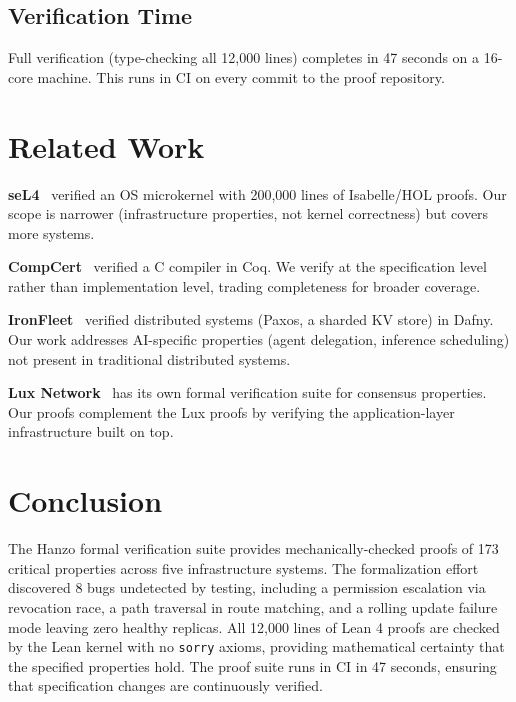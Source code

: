 \documentclass[11pt]{article}
\begin{document}
\subsection{Verification Time}

Full verification (type-checking all 12,000 lines) completes in 47 seconds on
a 16-core machine. This runs in CI on every commit to the proof repository.

\section{Related Work}
\label{sec:related}

\textbf{seL4}~\cite{sel4} verified an OS microkernel with 200,000 lines of
Isabelle/HOL proofs. Our scope is narrower (infrastructure properties, not
kernel correctness) but covers more systems.

\textbf{CompCert}~\cite{compcert} verified a C compiler in Coq. We verify at
the specification level rather than implementation level, trading completeness
for broader coverage.

\textbf{IronFleet}~\cite{ironfleet} verified distributed systems (Paxos, a
sharded KV store) in Dafny. Our work addresses AI-specific properties (agent
delegation, inference scheduling) not present in traditional distributed
systems.

\textbf{Lux Network}~\cite{luxwhitepaper} has its own formal verification
suite for consensus properties. Our proofs complement the Lux proofs by
verifying the application-layer infrastructure built on top.

\section{Conclusion}
\label{sec:conclusion}

The Hanzo formal verification suite provides mechanically-checked proofs of
173 critical properties across five infrastructure systems. The formalization
effort discovered 8 bugs undetected by testing, including a permission
escalation via revocation race, a path traversal in route matching, and a
rolling update failure mode leaving zero healthy replicas. All 12,000 lines of
Lean 4 proofs are checked by the Lean kernel with no \texttt{sorry} axioms,
providing mathematical certainty that the specified properties hold. The proof
suite runs in CI in 47 seconds, ensuring that specification changes are
continuously verified.
\end{document}
